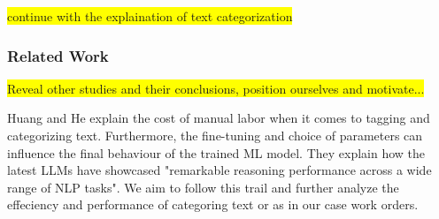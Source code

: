 \documentclass{article}
\begin{document}
\colorbox{yellow}{continue with the explaination of text categorization}

\subsubsection{Related Work}
\colorbox{yellow}{Reveal other studies and their conclusions, position ourselves and motivate...}






Huang and He \cite{huang2024} explain the cost of manual labor when it comes to tagging and categorizing text.
Furthermore, the fine-tuning and choice of parameters can influence the final behaviour of the trained
ML model.
They explain how the latest LLMs have showcased "remarkable reasoning performance across a wide range of
NLP tasks".
We aim to follow this trail and further analyze the effeciency and performance of categoring text or as in our
case work orders.



\end{document}
